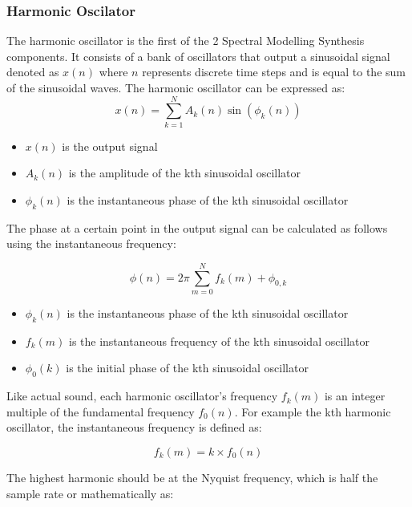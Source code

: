 \subsubsection{Harmonic Oscilator}

The harmonic oscillator is the first of the 2 Spectral Modelling Synthesis components. It consists of a bank of oscillators that output a sinusoidal signal denoted as $x(n)$ where $n$ represents discrete time steps and is equal to the sum of the sinusoidal waves. The harmonic oscillator can be expressed as:
\
\begin{equation}
    x(n) = \sum_{k=1}^{N} A_k(n) \sin(\phi_k(n))
\end{equation}

\begin{itemize}
    \item $x(n)$ is the output signal
    \item $A_k(n)$ is the amplitude of the kth sinusoidal oscillator
    \item $\phi_k(n)$ is the instantaneous phase of the kth sinusoidal oscillator
\end{itemize}

The phase at a certain point in the output signal can be calculated as follows using the instantaneous frequency:

\begin{equation}
    \phi(n) = 2\pi\sum_{m=0}^N f_k(m) + \phi_{0,k}
\end{equation}

\begin{itemize}
    \item $\phi_k(n)$ is the instantaneous phase of the kth sinusoidal oscillator
    \item $f_k(m)$ is the instantaneous frequency of the kth sinusoidal oscillator
    \item $\phi_0(k)$ is the initial phase of the kth sinusoidal oscillator
\end{itemize}

Like actual sound, each harmonic oscillator's frequency $f_k(m)$ is an integer multiple of the fundamental frequency $f_0(n)$. For example the kth harmonic oscillator, the instantaneous frequency is defined as:

\begin{equation}
    f_k(m) = k \times f_0(n)
\end{equation}

The highest harmonic should be at the Nyquist frequency, which is half the sample rate or mathematically as:

